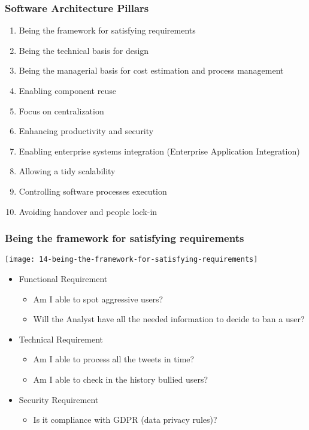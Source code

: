 \subsubsection{Software Architecture Pillars}
\begin{enumerate}
	\item Being the framework for satisfying requirements
	\item Being the technical basis for design 
	\item Being the managerial basis for cost estimation and process management
	\item Enabling component reuse
	\item Focus on centralization
	\item Enhancing productivity and security
	\item Enabling enterprise systems integration (Enterprise Application Integration)
	\item Allowing a tidy scalability
	\item Controlling software processes execution
	\item Avoiding handover and people lock-in
\end{enumerate}

\subsubsection{Being the framework for satisfying requirements}
\begin{center}
\texttt{[image: 14-being-the-framework-for-satisfying-requirements]}
\end{center}
\begin{itemize}
	\item Functional Requirement
	\begin{itemize}
		\item Am I able to spot aggressive users?
		\item Will the Analyst have all the needed information to decide to ban a user?

	\end{itemize}
	\item Technical Requirement
	\begin{itemize}
		\item Am I able to process all the tweets in time?
		\item Am I able to check in the history bullied users?
	\end{itemize}
	\item Security Requirement
	\begin{itemize}
		\item Is it compliance with GDPR (data privacy rules)?
	\end{itemize}
\end{itemize}

